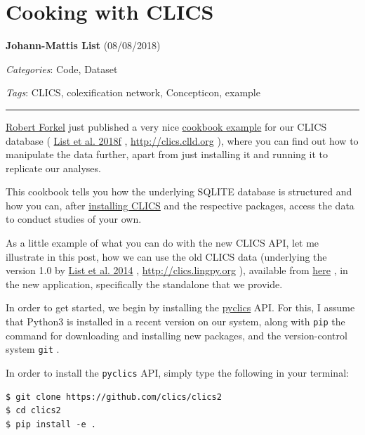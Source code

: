 \documentclass[
  english,
  a4paper,
  oneside,tablecaptionabove
]{scrbook}
\newcommand{\passthrough}[1]{#1}
\begin{document}
\hypertarget{cooking-with-clics}{%
\chapter{Cooking with CLICS}\label{cooking-with-clics}}

\textbf{Johann-Mattis List} (08/08/2018)

\emph{Categories}: Code, Dataset

\emph{Tags}: CLICS, colexification network, Concepticon, example

\begin{center}\rule{0.5\linewidth}{\linethickness}\end{center}

\href{https://github.com/xrotwang/}{Robert Forkel} just published a very
nice
\href{https://github.com/clics/clics2/tree/master/cookbook}{cookbook
example} for our CLICS database (
\href{http://bibliography.lingpy.org?key=List2018f}{List et al. 2018f} ,
\url{http://clics.clld.org} ), where you can find out how to manipulate
the data further, apart from just installing it and running it to
replicate our analyses.

This cookbook tells you how the underlying SQLITE database is structured
and how you can, after \href{https://github.com/clics/clics2}{installing
CLICS} and the respective packages, access the data to conduct studies
of your own.

As a little example of what you can do with the new CLICS API, let me
illustrate in this post, how we can use the old CLICS data (underlying
the version 1.0 by
\href{http://bibliography.lingpy.org?key=List2014f}{List et al. 2014} ,
\url{http://clics.lingpy.org} ), available from
\href{https://github.com/clics/clics1}{here} , in the new application,
specifically the standalone that we provide.

\leavevmode\hypertarget{markdown}{}%
In order to get started, we begin by installing the
\href{https://github.com/clics/clics2}{pyclics} API. For this, I assume
that Python3 is installed in a recent version on our system, along with
\passthrough{\lstinline!pip!} the command for downloading and installing
new packages, and the version-control system
\passthrough{\lstinline!git!} .

In order to install the \passthrough{\lstinline!pyclics!} API, simply
type the following in your terminal:

\begin{lstlisting}
$ git clone https://github.com/clics/clics2
$ cd clics2
$ pip install -e .
\end{lstlisting}
\end{document}
